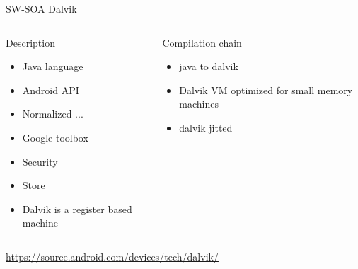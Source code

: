 %
\begin{Frame}{SW-SOA Dalvik}
  \begin{columns}[t]
    \begin{column}{5cm} %
      \begin{block}{Description}
        \begin{itemize}
        \item Java language
        \item Android API
        \item Normalized ...
        \item Google toolbox
        \item Security
        \item Store
        \item Dalvik is a register based machine
        \end{itemize}
      \end{block} 
    \end{column}
    
    \begin{column}{5cm} %
      \begin{block}{Compilation chain}
        \begin{itemize}
        \item java to dalvik
        \item Dalvik VM optimized for small memory machines
        \item dalvik jitted
        \end{itemize}
      \end{block}   
    \end{column}
  \end{columns}  
\url{https://source.android.com/devices/tech/dalvik/}
\end{Frame}


